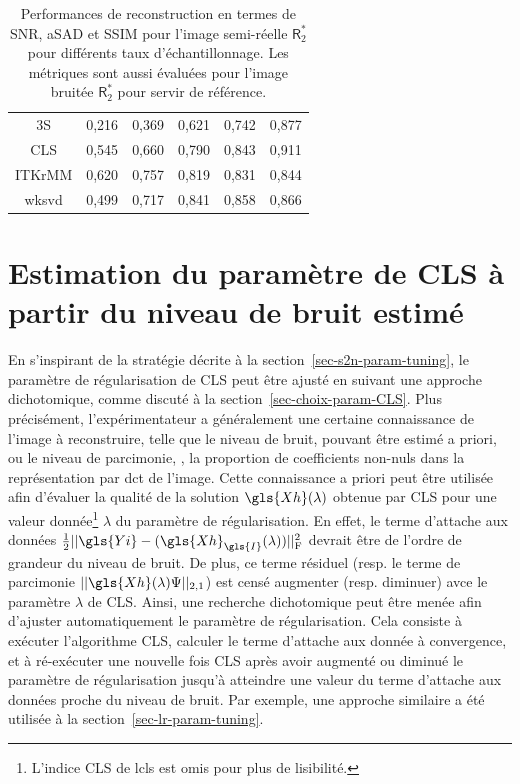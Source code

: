 \begin{table}[h!]
{\begin{tabular}{*{6}{c}}
            3S&0,216&0,369&0,621&0,742&0,877\\
            CLS&0,545&0,660&0,790&0,843&0,911\\
            ITKrMM&0,620&0,757&0,819&0,831&0,844\\
            \gls{wksvd}&0,499&0,717&0,841&0,858&0,866\\
            \bottomrule
        \end{tabular}
    }
    \caption{Performances de reconstruction en termes de SNR, aSAD et SSIM pour l'image semi-réelle $\mathsf{R}_2^*$ pour différents taux d'échantillonnage. Les métriques sont aussi évaluées pour l'image bruitée $\mathsf{R}_2^*$ pour servir de référence.
        \protect\label{table-higher-samp-ratio}}
\end{table}



%
\section{Estimation du paramètre de CLS à partir du niveau de bruit estimé}\label{sec-lcls-param-estim}

En s'inspirant de la stratégie décrite à la section~\ref{sec-s2n-param-tuning}, le paramètre de régularisation de CLS peut être ajusté en suivant une approche dichotomique, comme discuté à la section~\ref{sec-choix-param-CLS}. Plus précisément, l'expérimentateur a généralement une certaine connaissance de l'image à reconstruire, telle que le niveau de bruit, pouvant être estimé a priori, ou le niveau de parcimonie, \ie{}, la proportion de coefficients non-nuls dans la représentation par \gls{dct} de l'image. Cette connaissance a priori peut être utilisée afin d'évaluer la qualité de la solution $\gls{Xh}(\lambda)$ obtenue par CLS pour une valeur donnée\footnote{L'indice CLS de \gls{lcls} est omis pour plus de lisibilité.} $\lambda$ du paramètre de régularisation. En effet, le terme d'attache aux données $\frac{1}{2} \frobnorm{\gls{Yi} - (\gls{Xh}_{\gls{I}}(\lambda))}$ devrait être de l'ordre de grandeur du niveau de bruit. De plus, ce terme résiduel (resp. le terme de parcimonie $||\gls{Xh}(\lambda)\Psi||_{2, 1}$)  est censé augmenter (resp. diminuer) avce le paramètre $\lambda$ de CLS. Ainsi, une recherche dichotomique peut être menée afin d'ajuster automatiquement le paramètre de régularisation. Cela consiste à exécuter l'algorithme CLS, calculer le terme d'attache aux donnée à convergence, et à ré-exécuter une nouvelle fois CLS après avoir augmenté ou diminué le paramètre de régularisation jusqu'à atteindre une valeur du terme d'attache aux données proche du niveau de bruit. Par exemple, une approche similaire a été utilisée à la section~\ref{sec-lr-param-tuning}.

